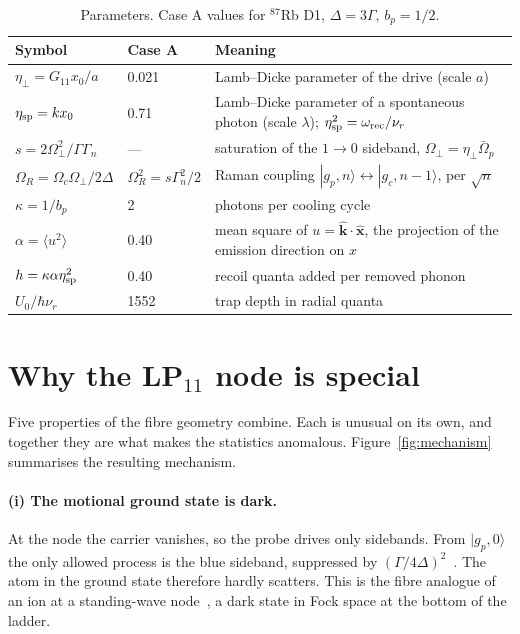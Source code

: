 \documentclass[11pt,a4paper]{article}
\newcommand{\ket}[1]{|#1\rangle}
\newcommand{\Om}{\Omega}
\newcommand{\etap}{\eta_\perp}
\newcommand{\etasp}{\eta_{\rm sp}}
\newcommand{\nur}{\nu_r}
\begin{document}
\begin{table}[h]
\centering\small
\caption{Parameters. Case A values for $^{87}$Rb D1, $\Delta=3\Gamma$, $b_p=1/2$.}
\label{tab:params}
\begin{tabularx}{\textwidth}{@{}llX@{}}
\toprule
Symbol & Case A & Meaning\\
\midrule
$\etap=G_{11}x_0/a$ & 0.021 & Lamb--Dicke parameter of the drive (scale $a$)\\
$\etasp=kx_0$ & 0.71 & Lamb--Dicke parameter of a spontaneous photon (scale $\lambda$); $\etasp^2=\omega_{\rm rec}/\nur$\\
$s=2\Om_\perp^2/\Gamma\Gamma_n$ & --- & saturation of the $1\to0$ sideband, $\Om_\perp=\etap\bar\Om_p$\\
$\Om_R=\Om_c\Om_\perp/2\Delta$ & $\Om_R^2=s\Gamma_n^2/2$ & Raman coupling $\ket{g_p,n}\leftrightarrow\ket{g_c,n-1}$, per $\sqrt n$\\
$\kappa=1/b_p$ & 2 & photons per cooling cycle\\
$\alpha=\langle u^2\rangle$ & 0.40 & mean square of $u=\hat{\mathbf k}\cdot\hat{\mathbf x}$, the projection of the emission direction on $x$\\
$h=\kappa\alpha\etasp^2$ & 0.40 & recoil quanta added per removed phonon\\
$U_0/\hbar\nur$ & 1552 & trap depth in radial quanta\\
\bottomrule
\end{tabularx}
\end{table}

\section{Why the LP$_{11}$ node is special}
\label{sec:special}
Five properties of the fibre geometry combine. Each is unusual on its own, and together they are what makes the statistics anomalous. Figure~\ref{fig:mechanism} summarises the resulting mechanism.

\paragraph{(i) The motional ground state is dark.} At the node the carrier vanishes, so the probe drives only sidebands. From $\ket{g_p,0}$ the only allowed process is the blue sideband, suppressed by $(\Gamma/4\Delta)^2$~\cite{morigi2000}. The atom in the ground state therefore hardly scatters. This is the fibre analogue of an ion at a standing-wave node~\cite{cirac1992}, a dark state in Fock space at the bottom of the ladder.
\end{document}
